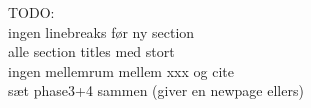 TODO:\\
ingen linebreaks før ny section\\
alle section titles med stort\\
ingen mellemrum mellem xxx og cite\\
sæt phase3+4 sammen (giver en newpage ellers)
%
%
%
%
